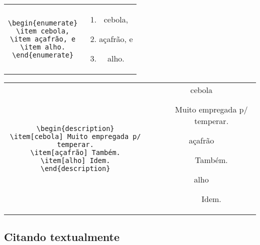 \begin{center}\footnotesize\smallskip
\begin{tabular}{cc}
\begin{minipage}{.465\textwidth}
\begin{verbatim}
\begin{enumerate}
\item cebola,
\item açafrão, e
\item alho.
\end{enumerate}
\end{verbatim}
\end{minipage} &
\begin{minipage}{.465\textwidth}
\begin{enumerate}
\item cebola,
\item açafrão, e
\item alho.
\end{enumerate}
\end{minipage}
\end{tabular}
\smallskip
\end{center}

\begin{center}\footnotesize\smallskip
\begin{tabular}{cc}
\begin{minipage}{.465\textwidth}
\begin{verbatim}
\begin{description}
\item[cebola] Muito empregada p/ temperar.
\item[açafrão] Também.
\item[alho] Idem.
\end{description}
\end{verbatim}
\end{minipage} &
\begin{minipage}{.465\textwidth}
\begin{description}
\item[cebola] Muito empregada p/ temperar.
\item[açafrão] Também.
\item[alho] Idem.
\end{description}
\end{minipage}
\end{tabular}
\smallskip
\end{center}

\subsection{Citando textualmente}

